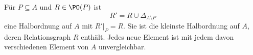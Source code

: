\begin{theorem}
\label{b12guide:thm:isolated-extension}
Für $P\subseteq A$ und $R\in\PO(P)$ ist
\[
 R'=R\cup\Delta_{A\setminus P}
\]
eine Halbordnung auf $A$ mit $R'|_P=R$.
Sie ist die kleinste Halbordnung auf $A$, deren Relationsgraph
$R$ enthält. Jedes neue Element ist mit jedem davon verschiedenen
Element von $A$ unvergleichbar.
\end{theorem}
